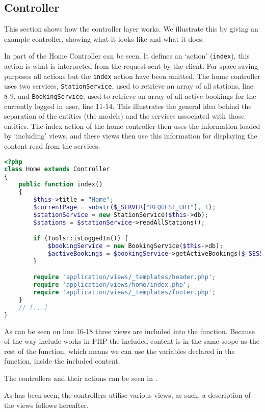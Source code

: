 \subsection{Controller}
This section shows how the controller layer works. 
We illustrate this by giving an example controller, showing what it looks like and what it does.

In  part of the Home Controller can be seen. 
It defines an `action' (\texttt{index}), this action is what is interpreted from the request sent by the client. 
For space saving purposes all actions but the \texttt{index} action have been omitted.
The home controller uses two services, \texttt{StationService}, used to retrieve an array of all stations, line 8-9, and \texttt{BookingService}, used to retrieve an array of all active bookings for the currently logged in user, line 11-14. 
This illustrates the general idea behind the separation of the entities (the models) and the services associated with those entities.
The index action of the home controller then uses the information loaded by `including' views, and these views then use this information for displaying the content read from the services.

\begin{minipage}{\textwidth}
\begin{lstlisting}[language=php, label=lst:homeController, caption={Home Controller Class.}]
<?php
class Home extends Controller
{
    public function index()
    {
        $this->title = "Home";
        $currentPage = substr($_SERVER["REQUEST_URI"], 1);
        $stationService = new StationService($this->db);
        $stations = $stationService->readAllStations();

        if (Tools::isLoggedIn()) {
            $bookingService = new BookingService($this->db);
            $activeBookings = $bookingService->getActiveBookings($_SESSION["login_user"]);
        }

        require 'application/views/_templates/header.php';
        require 'application/views/home/index.php';
        require 'application/views/_templates/footer.php';
    }
    // [...]
}
\end{lstlisting}
\end{minipage}

As can be seen on line 16-18 three views are included into the function. Because of the way include works in PHP the included content is in the same scope as the rest of the function, which means we can use the variables declared in the function, inside the included content.

The controllers and their actions can be seen in .

As has been seen, the controllers utilise various views, as such, a description of the views follows hereafter.